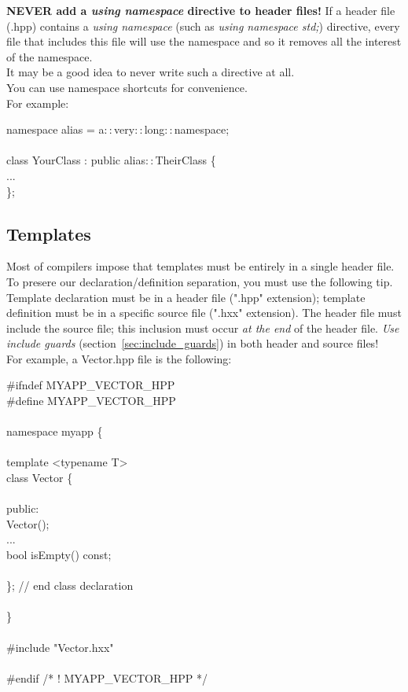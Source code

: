 {\bf NEVER add a {\it using namespace} directive to header
files!} If a header file (.hpp) contains a \emph{using namespace} (such as
\emph{using namespace std;}) directive, every file that includes this
file will use the namespace and so it removes all the interest of the
namespace.\\
It may be a good idea to never write such a directive at all.\\

You can use namespace shortcuts for convenience.\\

For example:
\begin{algorithm}[H]
namespace alias = a$::$very$::$long$::$namespace; \\
 \\
class YourClass : public alias$::$TheirClass \{ \\
... \\
\};
\end{algorithm}

\subsection{Templates}
\label{sec::templates}
Most of compilers impose that templates must be entirely in a single
header file. To presere our declaration/definition separation, you
must use the following tip.\\Template declaration must be in a header
file (".hpp" extension); template definition must be in a specific
source file (".hxx" extension). The header file must include the
source file; this inclusion must occur \emph{at the end} of the header
file. \emph{Use include guards} (section~\ref{sec:include_guards}) in
both header and source files!\\ For example, a Vector.hpp file is the
following:
\begin{algorithm}[H]
\#ifndef MYAPP\_VECTOR\_HPP \\
\#define MYAPP\_VECTOR\_HPP \\
 \\
namespace myapp \{\\
 \\
template <typename T> \\
class Vector \{ \\
 \\
public: \\
Vector(); \\
... \\
bool isEmpty() const; \\
 \\
\}; // end class declaration \\
 \\
\} \\
 \\
\#include "Vector.hxx" \\
 \\
\#endif /* ! MYAPP\_VECTOR\_HPP */
\end{algorithm}

